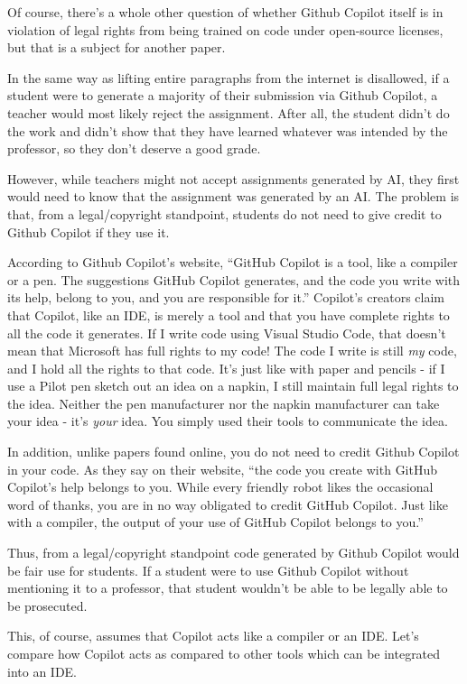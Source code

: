 \documentclass{article}
\begin{document}
Of course, there's a whole other question of whether Github Copilot itself is in violation of legal rights from being trained on code under open-source licenses, but that is a subject for another paper.

In the same way as lifting entire paragraphs from the internet is disallowed, if a student were to generate a majority of their submission via Github Copilot, a teacher would most likely reject the assignment. After all, the student didn't do the work and didn't show that they have learned whatever was intended by the professor, so they don't deserve a good grade.

However, while teachers might not accept assignments generated by AI, they first would need to know that the assignment was generated by an AI. The problem is that, from a legal/copyright standpoint, students do not need to give credit to Github Copilot if they use it.

According to Github Copilot's website, ``GitHub Copilot is a tool, like a compiler or a pen. The suggestions GitHub Copilot generates, and the code you write with its help, belong to you, and you are responsible for it.'' Copilot's creators claim that Copilot, like an IDE, is merely a tool and that you have complete rights to all the code it generates. If I write code using Visual Studio Code, that doesn't mean that Microsoft has full rights to my code! The code I write is still \emph{my} code, and I hold all the rights to that code. It's just like with paper and pencils - if I use a Pilot pen sketch out an idea on a napkin, I still maintain full legal rights to the idea. Neither the pen manufacturer nor the napkin manufacturer can take your idea - it's \emph{your} idea. You simply used their tools to communicate the idea.

In addition, unlike papers found online, you do not need to credit Github Copilot in your code. As they say on their website, ``the code you create with GitHub Copilot's help belongs to you. While every friendly robot likes the occasional word of thanks, you are in no way obligated to credit GitHub Copilot. Just like with a compiler, the output of your use of GitHub Copilot belongs to you.''

Thus, from a legal/copyright standpoint code generated by Github Copilot would be fair use for students. If a student were to use Github Copilot without mentioning it to a professor, that student wouldn't be able to be legally able to be prosecuted.

This, of course, assumes that Copilot acts like a compiler or an IDE. Let's compare how Copilot acts as compared to other tools which can be integrated into an IDE.
\end{document}
